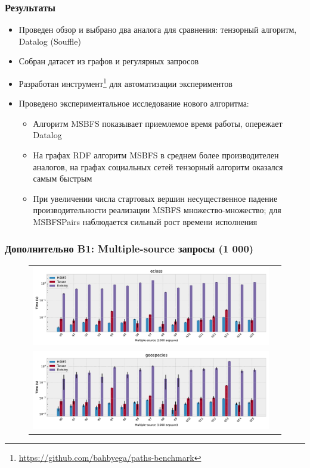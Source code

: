 \documentclass{beamer}
\begin{document}
\begin{frame}
  \frametitle{Результаты}
  \begin{itemize}
    \item Проведен обзор и выбрано два аналога для сравнения: тензорный алгоритм, Datalog (Souffle)
    \item Собран датасет из графов и регулярных запросов
    \item Разработан инструмент\footnote{\href{https://github.com/bahbyega/paths-benchmark}{https://github.com/bahbyega/paths-benchmark}} для автоматизации экспериментов
    \item Проведено экспериментальное исследование нового алгоритма:
          \begin{itemize}
            \item Алгоритм MSBFS показывает приемлемое время работы, опережает Datalog
            \item На графах RDF алгоритм MSBFS в среднем более производителен аналогов, на графах социальных сетей тензорный алгоритм оказался самым быстрым
            \item При увеличении числа стартовых вершин несущественное падение производительности реализации MSBFS множество-множество; для MSBFSPairs наблюдается сильный рост времени исполнения
          \end{itemize}
  \end{itemize}
\end{frame}

\appendix

\begin{frame}[fragile]
  \frametitle{Дополнительно B1: Multiple-source запросы (1 000)}
  \begin{figure}
    \begin{tabular}{cc}
      \includegraphics[width=110mm]{pictures/eclass_ms1000.pdf}     \\
      \includegraphics[width=110mm]{pictures/geospecies_ms1000.pdf} \\
    \end{tabular}
  \end{figure}
\end{frame}
\end{document}

